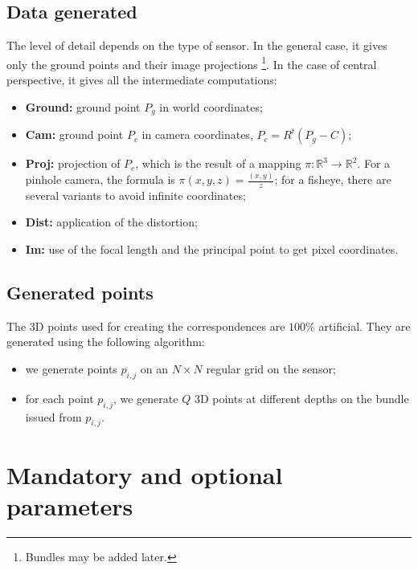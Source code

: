\documentclass[a4paper]{article}
\begin{document}
\subsection{Data generated}

The level of detail depends on the type of sensor. In the general case, it
gives only the ground points and their image projections%
\footnote{Bundles may be added later.}.
In the case of central perspective, it gives all the intermediate computations:

\begin{itemize}
  \item \textbf{Ground:} ground point $P_g$ in world coordinates;
  \item \textbf{Cam:} ground point $P_c$ in camera coordinates,
        $P_c = R^t (P_g - C)$;
  \item \textbf{Proj:} projection of $P_c$, which is the result of a mapping
        $\pi : \mathbb{R}^3 \to \mathbb{R}^2$. For a pinhole camera, the
        formula is $\pi(x,y,z) = \frac{(x,y)}{z}$; for a fisheye, there are
        several variants to avoid infinite coordinates;
  \item \textbf{Dist:} application of the distortion;
  \item \textbf{Im:} use of the focal length and the principal point to get
        pixel coordinates.
\end{itemize}


\subsection{Generated points}

The $3$D points used for creating the correspondences are $100\%$ artificial.
They are generated using the following algorithm:

\begin{itemize}
  \item we generate points $p_{i,j}$ on an $N \times N$ regular grid on the
        sensor;
  \item for each point $p_{i,j}$, we generate $Q$ $3$D points at different
        depths on the bundle issued from $p_{i,j}$.
\end{itemize}


\section{Mandatory and optional parameters}
\end{document}
